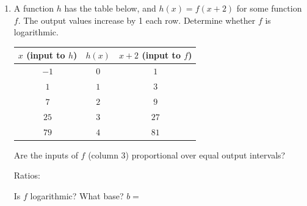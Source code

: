 \documentclass[10pt]{article}
\begin{document}
\begin{enumerate}[leftmargin=1.8em, itemsep=14pt]
\begin{enumerate}[leftmargin=1.5em, itemsep=8pt, label=\alph*.]
  \item Fill in the end behavior.

  \vspace{4pt}
  $\displaystyle\lim_{x \to 0^+} (-\log_2 x) = $ \smash{\gradedblank[id=hw2a1, type=short, points=1, answer={\infty}]{3cm}{13pt}} \qquad
  $\displaystyle\lim_{x \to \infty} (-\log_2 x) = $ \smash{\gradedblank[id=hw2a2, type=short, points=1, answer={-\infty}]{3cm}{13pt}}

  \item Is $g$ increasing or decreasing? Use the inverse relationship to explain.

        \rubricbox{\gradedblank[id=hw2b, type=rubric, points=2,
  display={Decreasing. $\log_2 x$ is increasing because $b = 2 > 1$, but the factor $a = -1$ reflects the outputs, so $g$ is always decreasing.}]{\linewidth}{24pt}}
\end{enumerate}

\item A function $h$ has the table below, and $h(x) = f(x + 2)$ for some function $f$.
      The output values increase by 1 each row. Determine whether $f$ is logarithmic.

\vspace{6pt}
\begin{center}
\renewcommand{\arraystretch}{1.8}
\begin{tabular}{|c|c|c|}
\hline
\rowcolor{sky}
$x$ (input to $h$) & $h(x)$ & $x + 2$ (input to $f$) \\
\hline
$-1$ & $0$ & $1$ \\
\hline
$1$  & $1$ & $3$ \\
\hline
$7$  & $2$ & $9$ \\
\hline
$25$ & $3$ & $27$ \\
\hline
$79$ & $4$ & $81$ \\
\hline
\end{tabular}
\end{center}

\vspace{6pt}
Are the inputs of $f$ (column 3) proportional over equal output intervals?

\vspace{4pt}
Ratios: \smash{\gradedblank[id=hw3a, type=short, points=1, answer={3}, display={$3/1 = 9/3 = 27/9 = 81/27 = 3$}]{6cm}{13pt}}

\vspace{4pt}
Is $f$ logarithmic? \smash{\gradedblank[id=hw3b, type=short, check=text, points=1, answer={yes}]{2cm}{13pt}} \quad What base? $b = $ \smash{\gradedblank[id=hw3c, type=short, points=1, answer={3}]{2cm}{13pt}}



\end{enumerate}
\end{document}
